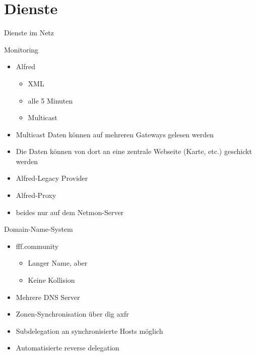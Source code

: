 \section{Dienste}
\begin{frame}{}
    \begin{center}
        Dienste im Netz
     \end{center}
\end{frame}

\begin{frame}{Monitoring}
    \begin{itemize}
        \item Alfred
        \begin{itemize}
            \item XML
            \item alle 5 Minuten
            \item Multicast
        \end{itemize}
        \item Multicast Daten können auf mehreren Gateways gelesen werden
        \item Die Daten können von dort an eine zentrale Webseite (Karte, etc.) geschickt werden
    \end{itemize}
    \begin{itemize}
        \item Alfred-Legacy Provider
        \item Alfred-Proxy
        \item beides nur auf dem Netmon-Server
    \end{itemize}
\end{frame}

\begin{frame}{Domain-Name-System}
    \begin{itemize}
        \item fff.community
        \begin{itemize}
            \item Langer Name, aber
            \item Keine Kollision
        \end{itemize}
        \item Mehrere DNS Server
        \item Zonen-Synchronisation über dig axfr
        \item Subdelegation an synchronisierte Hosts möglich
        \item Automatisierte reverse delegation
    \end{itemize}
\end{frame}

